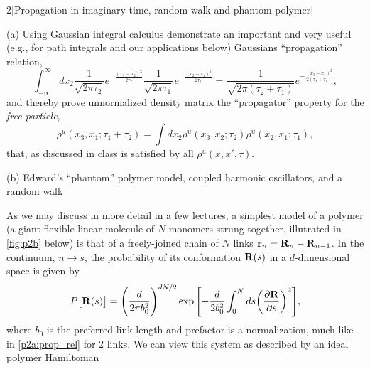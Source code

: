 \documentclass[12pt]{article}
\begin{document}
\begin{problem}{2}[Propagation in imaginary time, random walk and phantom
    polymer]

(a) Using Gaussian integral calculus demonstrate an important and very useful
(e.g., for path integrals and our applications below) Gaussians ``propagation''
relation,
\begin{equation}\label{p2a:prop_rel}
    \int_{-\infty}^\infty
    dx_2\frac1{\sqrt{2\pi\tau_2}}e^{-\frac{(x_3-x_2)^2}{2\tau_2}}
    \frac1{\sqrt{2\pi\tau_1}}e^{-\frac{(x_2-x_1)^2}{2\tau_1}}
    =\frac1{\sqrt{2\pi(\tau_2+\tau_1)}}e^{-\frac{(x_3-x_1)^2}{2(\tau_2+\tau_1)}},
\end{equation}
and thereby prove unnormalized density matrix the ``propagator'' property for
the \textit{free-particle},
\begin{equation}
    \rho^u(x_3,x_1;\tau_1+\tau_2)
    =\int dx_2\rho^u(x_3,x_2;\tau_2)\rho^u(x_2,x_1;\tau_1),
\end{equation}
that, as discussed in class is satisfied by all $\rho^u(x,x',\tau)$.
\begin{solution}
\end{solution}

(b) Edward's ``phantom'' polymer model, coupled harmonic oscillators, and a
random walk

As we may discuss in more detail in a few lectures, a simplest model of a
polymer (a giant flexible linear molecule of $N$ monomers strung together,
illutrated in \cref{fig:p2b} below) is that of a freely-joined chain of $N$
links $\vb{r}_n=\vb{R}_n-\vb{R}_{n-1}$. In the continuum, $n\to s$, the
probability of its conformation $\vb{R}(s)$ in a $d$-dimensional space is given
by
\begin{equation}
    P\qty[\vb{R}(s)]=\qty(\frac{d}{2\pi b_0^2})^{dN/2}
    \exp\qty[-\frac{d}{2b_0^2}\int_0^N ds\qty(\frac{\partial\vb{R}}{\partial
        s})^2],
\end{equation}
where $b_0$ is the preferred link length and prefactor is a normalization, much
like in \cref{p2a:prop_rel} for 2 links. We can view this system as described by
an ideal polymer Hamiltonian


\end{problem}
\end{document}
